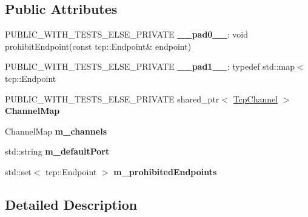 \subsection*{Public Attributes}
\begin{DoxyCompactItemize}
\item 
P\+U\+B\+L\+I\+C\+\_\+\+W\+I\+T\+H\+\_\+\+T\+E\+S\+T\+S\+\_\+\+E\+L\+S\+E\+\_\+\+P\+R\+I\+V\+A\+TE {\bfseries \+\_\+\+\_\+pad0\+\_\+\+\_\+}\+: void prohibit\+Endpoint(const tcp\+::\+Endpoint\& endpoint)\hypertarget{classnfd_1_1TcpFactory_a519df59559a5b6a75511c9a1d0f91548}{}\label{classnfd_1_1TcpFactory_a519df59559a5b6a75511c9a1d0f91548}

\item 
P\+U\+B\+L\+I\+C\+\_\+\+W\+I\+T\+H\+\_\+\+T\+E\+S\+T\+S\+\_\+\+E\+L\+S\+E\+\_\+\+P\+R\+I\+V\+A\+TE {\bfseries \+\_\+\+\_\+pad1\+\_\+\+\_\+}\+: typedef std\+::map$<$ tcp\+::\+Endpoint\hypertarget{classnfd_1_1TcpFactory_ad7e323737ed2d8ad61135c6995bcbbc7}{}\label{classnfd_1_1TcpFactory_ad7e323737ed2d8ad61135c6995bcbbc7}

\item 
P\+U\+B\+L\+I\+C\+\_\+\+W\+I\+T\+H\+\_\+\+T\+E\+S\+T\+S\+\_\+\+E\+L\+S\+E\+\_\+\+P\+R\+I\+V\+A\+TE shared\+\_\+ptr$<$ \hyperlink{classnfd_1_1TcpChannel}{Tcp\+Channel} $>$ {\bfseries Channel\+Map}\hypertarget{classnfd_1_1TcpFactory_a75c6e211dd704378c8ffdbfee2a79374}{}\label{classnfd_1_1TcpFactory_a75c6e211dd704378c8ffdbfee2a79374}

\item 
Channel\+Map {\bfseries m\+\_\+channels}\hypertarget{classnfd_1_1TcpFactory_a934d109a04dc7676a5fe0843189c2055}{}\label{classnfd_1_1TcpFactory_a934d109a04dc7676a5fe0843189c2055}

\item 
std\+::string {\bfseries m\+\_\+default\+Port}\hypertarget{classnfd_1_1TcpFactory_aac0763157a8f0da4d7900db204e6ef3c}{}\label{classnfd_1_1TcpFactory_aac0763157a8f0da4d7900db204e6ef3c}

\item 
std\+::set$<$ tcp\+::\+Endpoint $>$ {\bfseries m\+\_\+prohibited\+Endpoints}\hypertarget{classnfd_1_1TcpFactory_a28369c4b015a9114444003310ddfbb2d}{}\label{classnfd_1_1TcpFactory_a28369c4b015a9114444003310ddfbb2d}

\end{DoxyCompactItemize}


\subsection{Detailed Description}


